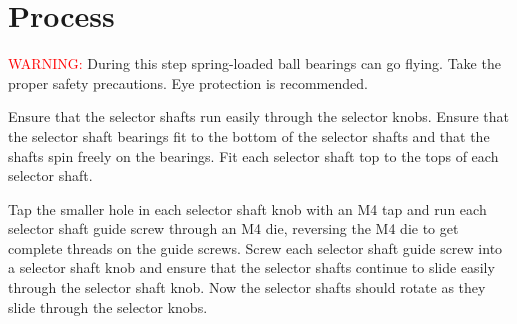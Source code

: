 \documentclass[openany]{book}
\begin{document}
\section{Process}
\textcolor{red}{WARNING:} During this step spring-loaded ball bearings can go flying. Take the proper safety precautions. Eye protection is recommended.

Ensure that the selector shafts run easily through the selector knobs. Ensure that the selector shaft bearings fit to the bottom of the selector shafts and that the shafts spin freely on the bearings. Fit each selector shaft top to the tops of each selector shaft.

Tap the smaller hole in each selector shaft knob with an M4 tap and run each selector shaft guide screw through an M4 die, reversing the M4 die to get complete threads on the guide screws. Screw each selector shaft guide screw into a selector shaft knob and ensure that the selector shafts continue to slide easily through the selector shaft knob. Now the selector shafts should rotate as they slide through the selector knobs.
\end{document}
